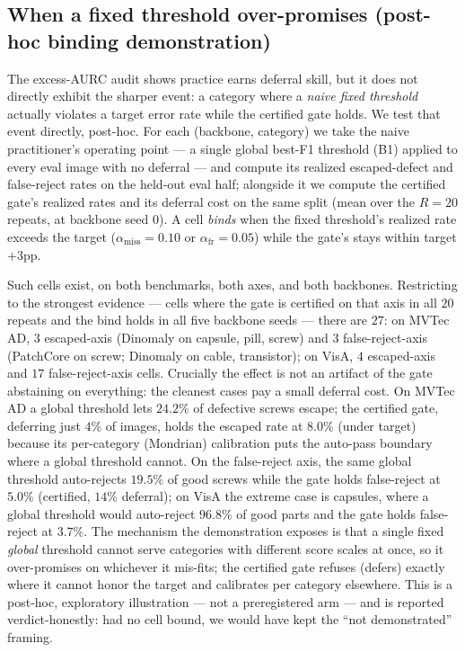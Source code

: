 \documentclass[11pt]{article}
\begin{document}
\subsection{When a fixed threshold over-promises (post-hoc binding demonstration)}
\label{sec:binding}

The excess-AURC audit shows practice earns deferral skill, but it does not directly exhibit the
sharper event: a category where a \emph{naive fixed threshold} actually violates a target error
rate while the certified gate holds. We test that event directly, post-hoc. For each
(backbone, category) we take the naive practitioner's operating point --- a single global best-F1
threshold (B1) applied to every eval image with no deferral --- and compute its realized
escaped-defect and false-reject rates on the held-out eval half; alongside it we compute the
certified gate's realized rates and its deferral cost on the same split (mean over the $R=20$
repeats, at backbone seed $0$). A cell \emph{binds} when the fixed threshold's realized rate
exceeds the target ($\alpha_{\text{miss}}=0.10$ or $\alpha_{\text{fr}}=0.05$) while the gate's stays
within target$+3$pp.

Such cells exist, on both benchmarks, both axes, and both backbones. Restricting to the strongest
evidence --- cells where the gate is certified on that axis in all $20$ repeats and the bind
holds in all five backbone seeds --- there are $27$: on MVTec AD, $3$ escaped-axis (Dinomaly on
capsule, pill, screw) and $3$ false-reject-axis (PatchCore on screw; Dinomaly on cable,
transistor); on VisA, $4$ escaped-axis and $17$ false-reject-axis cells. Crucially the effect is not
an artifact of the gate abstaining on everything: the cleanest cases pay a small deferral cost. On
MVTec AD a global threshold lets $24.2\%$ of defective screws escape; the certified gate,
deferring just $4\%$ of images, holds the escaped rate at $8.0\%$ (under target) because its
per-category (Mondrian) calibration puts the auto-pass boundary where a global threshold cannot. On
the false-reject axis, the same global threshold auto-rejects $19.5\%$ of good screws while the gate
holds false-reject at $5.0\%$ (certified, $14\%$ deferral); on VisA the extreme case is capsules,
where a global threshold would auto-reject $96.8\%$ of good parts and the gate holds false-reject at
$3.7\%$. The mechanism the demonstration exposes is that a single fixed \emph{global} threshold
cannot serve categories with different score scales at once, so it over-promises on whichever it
mis-fits; the certified gate refuses (defers) exactly where it cannot honor the target and
calibrates per category elsewhere. This is a post-hoc, exploratory illustration --- not a
preregistered arm --- and is reported verdict-honestly: had no cell bound, we would have kept the
``not demonstrated'' framing.
\end{document}
